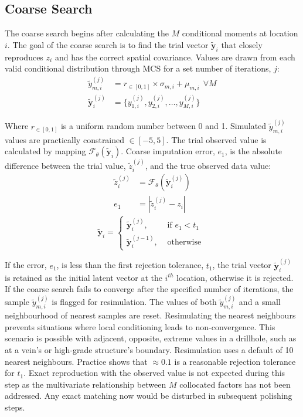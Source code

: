 \subsection{Coarse Search}
\label{subsec:05coarse}

The coarse search begins after calculating the $M$ conditional moments at location $i$. The goal of the coarse search is to find the trial vector $\tilde{\mathbf{y}}_{i}$ that closely reproduces $z_{i}$ and has the correct spatial covariance. Values are drawn from each valid conditional distribution through \gls{MCS} for a set number of iterations, $j$:
\begin{align}
    \tilde{y}_{m, i}^{(j)}       & = r_{\in[0,1]} \times \sigma_{m,i} + \mu_{m,i} \ \ \forall M \\
    \tilde{\mathbf{y}}_{i}^{(j)} & = \{ y_{1, i}^{(j)}, y_{2, i}^{(j)}, \dots, y_{M, i}^{(j)}\}
\end{align}

Where $r_{\in[0,1]}$ is a uniform random number between 0 and 1. Simulated $\tilde{y}_{m, i}^{(j)}$ values are practically constrained $\in[-5, 5]$. The trial observed value is calculated by mapping $\mathcal{F}_{\theta}(\tilde{\mathbf{y}}_{i})$. Coarse imputation error, $e_{1}$, is the absolute difference between the trial value, $\tilde{z}_{i}^{(j)}$, and the true observed data value:
\begin{align}
    \tilde{z}_{i}^{(j)} & = \mathcal{F}_{\theta}(\tilde{\mathbf{y}}_{i}^{(j)}) \\
    e_{1}               & = |\tilde{z}_{i}^{(j)} - z_{i}|
\end{align}
\begin{equation}
    \tilde{\mathbf{y}}_{i} =
    \begin{cases}
        \tilde{\mathbf{y}}_{i}^{(j)},   & \text{ if }e_{1} < t_{1} \\
        \tilde{\mathbf{y}}_{i}^{(j-1)}, & \text{ otherwise }
    \end{cases}
\end{equation}

If the error, $e_{1}$, is less than the first rejection tolerance, $t_{1}$, the trial vector $\tilde{\mathbf{y}}_{i}^{(j)}$ is retained as the initial latent vector at the $i^{th}$ location, otherwise it is rejected. If the coarse search fails to converge after the specified number of iterations, the sample $\tilde{y}_{m, i}^{(j)}$ is flagged for resimulation. The values of both $\tilde{y}_{m, i}^{(j)}$ and a small neighbourhood of nearest samples are reset. Resimulating the nearest neighbours prevents situations where local conditioning leads to non-convergence. This scenario is possible with adjacent, opposite, extreme values in a drillhole, such as at a vein's or high-grade structure's boundary. Resimulation uses a default of 10 nearest neighbours. Practice shows that $\approx 0.1$ is a reasonable rejection tolerance for $t_{1}$. Exact reproduction with the observed value is not expected during this step as the multivariate relationship between $M$ collocated factors has not been addressed. Any exact matching now would be disturbed in subsequent polishing steps.



